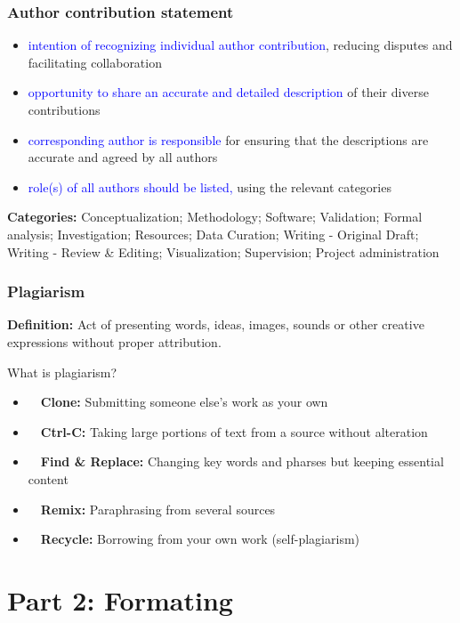 \documentclass[newPxFont,sthlmFooter]{beamer}
\newcommand{\fs}{\footnotesize}
\begin{document}
\begin{frame}\frametitle{Author contribution statement}
  \vspace{-0.5cm}
  \begin{itemize}
    \fs
  \item \textcolor{blue}{intention of recognizing individual author contribution}, reducing disputes and facilitating collaboration
  \item \textcolor{blue}{opportunity to share an accurate and detailed description} of their diverse contributions
  \item \textcolor{blue}{corresponding author is responsible} for ensuring that the descriptions are accurate and agreed by all authors
  \item \textcolor{blue}{role(s) of all authors should be listed,} using the relevant categories
  \end{itemize}
{\tiny{\bf Categories:} Conceptualization; Methodology; Software; Validation; Formal analysis; Investigation; Resources; Data Curation; Writing - Original Draft; Writing - Review \& Editing; Visualization; Supervision; Project administration}
\end{frame}

\begin{frame}\frametitle{Plagiarism}
{\bf Definition:} Act of presenting words, ideas, images, sounds or other creative expressions without proper attribution.
\begin{block}{\small What is plagiarism?}
\footnotesize
\begin{itemize}
\item \faClone~~{\bf Clone:} Submitting someone else's work as your own
\item \faCopy~~{\bf Ctrl-C:} Taking large portions of text from a source without alteration
\item \faRetweet~~{\bf Find \& Replace:} Changing key words and pharses but keeping essential content
\item \faRefresh~~{\bf Remix:} Paraphrasing from several sources
\item \faRecycle~~{\bf Recycle:} Borrowing from your own work (self-plagiarism)
\end{itemize}
\end{block}
\end{frame}

\section{Part 2: Formating}
\end{document}
